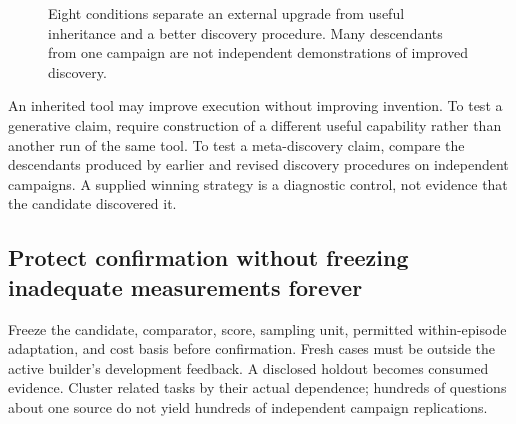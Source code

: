 \documentclass[11pt,letterpaper]{article}
\theoremstyle{remark}\newtheorem{remark}{Remark}[section]
\begin{document}
\begin{figure}[htbp]
\centering
{}
\caption{Eight conditions separate an external upgrade from useful inheritance and a better discovery procedure. Many descendants from one campaign are not independent demonstrations of improved discovery.}
\label{fig:factorial}
\end{figure}

An inherited tool may improve execution without improving invention. To test a generative claim, require construction of a different useful capability rather than another run of the same tool. To test a meta-discovery claim, compare the descendants produced by earlier and revised discovery procedures on independent campaigns. A supplied winning strategy is a diagnostic control, not evidence that the candidate discovered it.

\subsection{Protect confirmation without freezing inadequate measurements forever}
Freeze the candidate, comparator, score, sampling unit, permitted within-episode adaptation, and cost basis before confirmation. Fresh cases must be outside the active builder's development feedback. A disclosed holdout becomes consumed evidence. Cluster related tasks by their actual dependence; hundreds of questions about one source do not yield hundreds of independent campaign replications.
\end{document}
